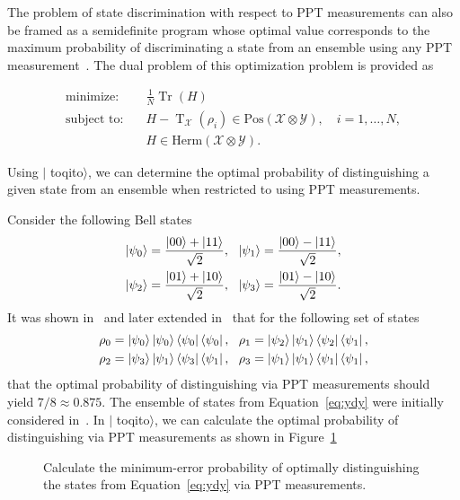 \documentclass[nofootinbib,superscriptaddress,a4paper,twocolumn,longbibliography,floatfix,pra]{revtex4-2}
\newcommand{\pt}{\operatorname{T}}
\renewcommand{\tr}{\operatorname{Tr}}
\newcommand{\setft}[1]{\mathrm{#1}}
\newcommand{\Pos}{\setft{Pos}}
\newcommand{\toqitofont}{%
	\fontfamily{FiraSans}%
	\selectfont}
\newcommand{\toqito}{ $|${\toqitofont toqito}$\rangle$\xspace}
\newcommand{\X}{\mathcal{X}}
\newcommand{\Y}{\mathcal{Y}}
\begin{document}
The problem of state discrimination with respect to PPT measurements can also
be framed as a semidefinite program whose optimal value corresponds to the
maximum probability of discriminating a state from an ensemble using any PPT
measurement~\cite{cosentino2013positive}. The dual problem of this optimization
problem is provided as
\begin{minipage}{1in}
\begin{equation} \label{eq:ppt-dual}
    \begin{aligned}
        \text{minimize:} 
        \quad & \frac{1}{N} \tr(H) \\ 
        \text{subject to:}
        \quad & H - \pt_{\X} (\rho_i) \in \Pos(\X \otimes \Y), \quad i = 1,
        \ldots, N, \\ & H \in \text{Herm}(\X \otimes \Y).
\end{aligned}
\end{equation}
\end{minipage}
Using \toqito, we can determine the optimal probability of distinguishing a
given state from an ensemble when restricted to using PPT measurements.

Consider the following Bell states
\begin{equation}
    \begin{aligned}
        \ket{\psi_0} = \frac{\ket{00} + \ket{11}}{\sqrt{2}}, & \ \ 
        \ket{\psi_1} = \frac{\ket{00} - \ket{11}}{\sqrt{2}}, \\
        \ket{\psi_2} = \frac{\ket{01} + \ket{10}}{\sqrt{2}}, & \ \ 
        \ket{\psi_3} = \frac{\ket{01} - \ket{10}}{\sqrt{2}}.
    \end{aligned}
\end{equation}
It was shown in~\cite{cosentino2013positive} and later extended
in~\cite{cosentino2013small} that for the following set of states
\begin{equation}\label{eq:ydy}
    \begin{aligned}
        \rho_0 = \ket{\psi_0} \ket{\psi_0} \bra{\psi_0} \bra{\psi_0}, \ \ 
        \rho_1 = \ket{\psi_2} \ket{\psi_1} \bra{\psi_2} \bra{\psi_1}, \\
        \rho_2 = \ket{\psi_3} \ket{\psi_1} \bra{\psi_3} \bra{\psi_1}, \ \
        \rho_3 = \ket{\psi_1} \ket{\psi_1} \bra{\psi_1} \bra{\psi_1}, \\
    \end{aligned}
\end{equation}
that the optimal probability of distinguishing via PPT measurements should
yield $7/8 \approx 0.875$. The ensemble of states from Equation~\eqref{eq:ydy}
were initially considered in~\cite{yu2012four}. In \toqito, we can calculate
the optimal probability of distinguishing via PPT measurements as shown in
Figure~\ref{fig:ppt_ydy}
\begin{figure}[!htpb]
    \centering
            
    \caption{Calculate the minimum-error probability of optimally
    distinguishing the states from Equation~\eqref{eq:ydy} via PPT
    measurements.}
    \label{fig:ppt_ydy}
\end{figure}
\end{document}
